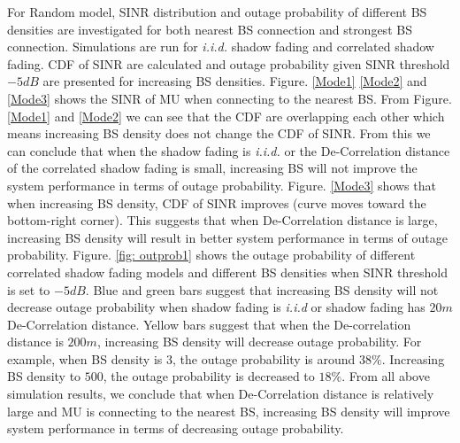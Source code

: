 \par For Random model, SINR distribution and outage probability of different BS densities are investigated for both nearest BS connection and strongest BS connection. Simulations are run for \emph{i.i.d.} shadow fading and correlated shadow fading. CDF of SINR are calculated and outage probability given SINR threshold $-5dB$ are presented for increasing BS densities. Figure. \ref{Mode1} \ref{Mode2} and \ref{Mode3} shows the SINR of MU when connecting to the nearest BS. From Figure. \ref{Mode1} and \ref{Mode2} we can see that the CDF are overlapping each other which means increasing BS density does not change the CDF of SINR. From this we can conclude that when the shadow fading is \emph{i.i.d.} or the De-Correlation distance of the correlated shadow fading is small, increasing BS will not improve the system performance in terms of outage probability. Figure. \ref{Mode3}  shows that when increasing BS density, CDF of SINR improves (curve moves toward the bottom-right corner). This suggests that when De-Correlation distance is large, increasing BS density will result in better system performance in terms of outage probability. Figure. \ref{fig: outprob1} shows the outage probability of different correlated shadow fading models and different BS densities when SINR threshold is set to $-5dB$. Blue and green bars suggest that increasing BS density will not decrease outage probability when shadow fading is \emph{i.i.d} or shadow fading has $20m$ De-Correlation distance. Yellow bars suggest that when the De-correlation distance is $200m$, increasing BS density will decrease outage probability. For example, when BS density is $3$, the outage probability is around $38\%$. Increasing BS density to $500$, the outage probability is decreased to $18\%$. From all above simulation results, we conclude that when De-Correlation distance is relatively large and MU is connecting to the nearest BS, increasing BS density will improve system performance in terms of decreasing outage probability.



